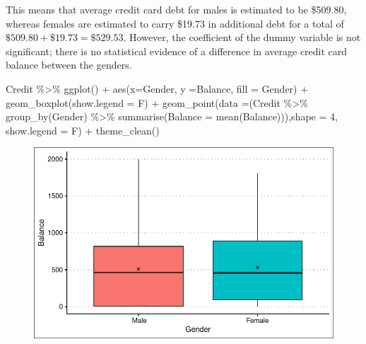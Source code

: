 \documentclass[
  letterpaper,
  DIV=11,
  numbers=noendperiod]{scrreprt}
\newenvironment{Shaded}{\begin{snugshade}}{\end{snugshade}}
\newcommand{\AttributeTok}[1]{\textcolor[rgb]{0.65,0.35,0.00}{#1}}
\newcommand{\DecValTok}[1]{\textcolor[rgb]{0.47,0.16,0.63}{#1}}
\newcommand{\FunctionTok}[1]{\textcolor[rgb]{0.02,0.16,0.49}{#1}}
\newcommand{\NormalTok}[1]{\textcolor[rgb]{0.33,0.33,0.33}{#1}}
\newcommand{\SpecialCharTok}[1]{\textcolor[rgb]{0.00,0.46,0.62}{#1}}
\begin{document}
This means that average credit card debt for males is estimated to be
\$509.80, whereas females are estimated to carry \$19.73 in additional
debt for a total of \(\$509.80 + \$19.73 = \$529.53\). However, the
coefficient of the dummy variable is not significant; there is no
statistical evidence of a difference in average credit card balance
between the genders.

\begin{Shaded}
\begin{Highlighting}[]
\NormalTok{Credit }\SpecialCharTok{\%\textgreater{}\%} 
  \FunctionTok{ggplot}\NormalTok{() }\SpecialCharTok{+} \FunctionTok{aes}\NormalTok{(}\AttributeTok{x=}\NormalTok{Gender, }\AttributeTok{y =}\NormalTok{Balance, }\AttributeTok{fill =}\NormalTok{ Gender) }\SpecialCharTok{+} \FunctionTok{geom\_boxplot}\NormalTok{(}\AttributeTok{show.legend =}\NormalTok{ F) }\SpecialCharTok{+} \FunctionTok{geom\_point}\NormalTok{(}\AttributeTok{data =}\NormalTok{(Credit }\SpecialCharTok{\%\textgreater{}\%} \FunctionTok{group\_by}\NormalTok{(Gender) }\SpecialCharTok{\%\textgreater{}\%} \FunctionTok{summarise}\NormalTok{(}\AttributeTok{Balance =} \FunctionTok{mean}\NormalTok{(Balance))),}\AttributeTok{shape =} \DecValTok{4}\NormalTok{, }\AttributeTok{show.legend =}\NormalTok{ F) }\SpecialCharTok{+} \FunctionTok{theme\_clean}\NormalTok{()}
\end{Highlighting}
\end{Shaded}

\begin{figure}[H]

{\centering \includegraphics{Chapter3_files/figure-pdf/unnamed-chunk-73-1.pdf}

}

\end{figure}
\end{document}
